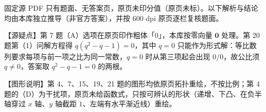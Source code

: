 

\begin{gktip}
固定源 PDF 只有题面、无答案页，原页未印分值（原页未标）。以下解析与结论均由本库独立推导（非官方答案），并按 600 dpi 原页逐栏复核题面。

【源疑点】第 7 题（A）选项在原页印作粗体「0」，本库按零向量 $\boldsymbol 0$ 处理。第 20 题第（1）问解方程得 $q(q^2-q-1)=0$，其中 $q=0$ 只能作为形式解：等比数列要求每项与前一项之比为同一常数，$q=0$ 时从第三项起会出现 $0/0$，故公比须 $q\neq0$，答案取 $q^2-q-1=0$ 的两根。

【图形说明】第 4、7、15、19、21 题的图形均依原页拓扑重绘，不按比例；第 4 题的（D）为干扰项，原页未给函数式，只按可辨认的形状（递增、下凸、在负半轴穿过 $x$ 轴、$y$ 轴截距 $1$、左端有水平渐近线）重绘。
\end{gktip}

